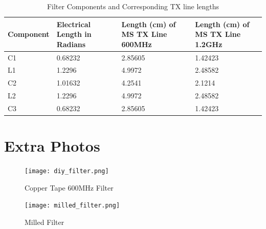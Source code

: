 \documentclass[journal]{IEEEtran}
\begin{document}
\begin{table}[]
    \centering
    \begin{tabularx}{0.5\textwidth}{XXXX}
        \toprule
        Component & Electrical   Length in Radians & Length (cm) of   MS TX Line 600MHz & Length (cm) of   MS TX Line 1.2GHz \\ \midrule
        C1        & 0.68232                        & 2.85605                            & 1.42423                            \\ \midrule
        L1        & 1.2296                         & 4.9972                             & 2.48582                            \\ \midrule
        C2        & 1.01632                        & 4.2541                             & 2.1214                             \\ \midrule
        L2        & 1.2296                         & 4.9972                             & 2.48582                            \\ \midrule
        C3        & 0.68232                        & 2.85605                            & 1.42423                            \\ \bottomrule
    \end{tabularx}

    \vspace{1em}
    \caption{Filter Components and Corresponding TX line lengths}
    \label{tab:tx_dims_2}
\end{table}

\section{Extra Photos}

\begin{figure}[hp]
    \centering
    \texttt{[image: diy\_filter.png]}
    \caption{Copper Tape 600MHz Filter}
\end{figure}

\begin{figure}[hp]
    \centering
    \texttt{[image: milled\_filter.png]}
    \caption{Milled Filter}
\end{figure}
\end{document}
